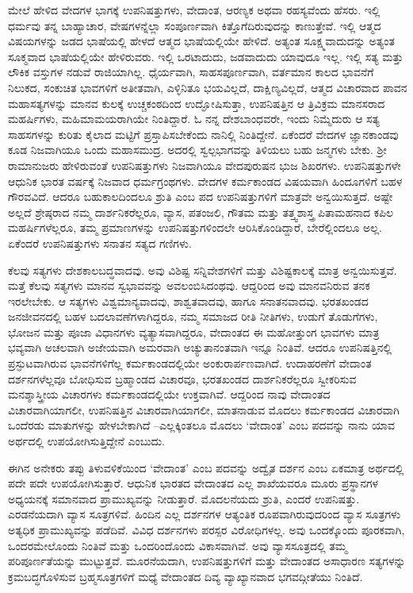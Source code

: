ಮೇಲೆ ಹೇಳಿದ ವೇದಗಳ ಭಾಗಕ್ಕೆ ಉಪನಿಷತ್ತುಗಳು, ವೇದಾಂತ, ಆರಣ್ಯಕ ಅಥವಾ ರಹಸ್ಯವೆಂದು ಹೆಸರು. ಇಲ್ಲಿ ಧರ್ಮವು ತನ್ನ ಬಾಹ್ಯಾಚಾರ, ವೇಷಗಳನ್ನೆಲ್ಲಾ ಸಂಪೂರ್ಣವಾಗಿ ಕಿತ್ತೊಗೆದಿರುವುದನ್ನು ಕಾಣುತ್ತೇವೆ. ಇಲ್ಲಿ ಆತ್ಮದ ವಿಷಯಗಳನ್ನು ಜಡದ ಭಾಷೆಯಲ್ಲಿ ಹೇಳದೆ ಆತ್ಮದ ಭಾಷೆಯಲ್ಲಿಯೇ ಹೇಳಿದೆ. ಅತ್ಯಂತ ಸೂಕ್ಷ್ಮವಾದುದನ್ನು ಅತ್ಯಂತ ಸೂಕ್ಮವಾದ ಭಾಷೆಯಲ್ಲಿಯೇ ಹೇಳಿರುವರು. ಇಲ್ಲಿ ಒರಟಾದುದು, ಜಡವಾದುದು ಯಾವುದೂ ಇಲ್ಲ. ಇಲ್ಲಿ ಸತ್ಯ ಮತ್ತು ಲೌಕಿಕ ವಸ್ತುಗಳ ನಡುವೆ ರಾಜಿಯಾಗಿಲ್ಲ. ಧೈರ್ಯವಾಗಿ, ಸಾಹಸಪೂರ್ಣವಾಗಿ, ವರ್ತಮಾನ ಕಾಲದ ಭಾವನೆಗೆ ನಿಲುಕದ, ಸಂಕುಚಿತ ಭಾವಗಳಿಗೆ ಅತೀತವಾಗಿ, ಎಳ್ಳಿನಿತೂ ಭಯವಿಲ್ಲದೆ, ದಾಕ್ಷಿಣ್ಯವಿಲ್ಲದೆ, ಆತ್ಮದ ವಿಚಾರವಾದ ಪಾವನ ಮಹಾಸತ್ಯಗಳನ್ನು ಮಾನವ ಕುಲಕ್ಕೆ ಉಚ್ಚಕಂಠದಿಂದ ಉದ್ಘೋಷಿಸುತ್ತಾ, ಉಪನಿಷತ್ತಿನ ಆ ತ್ರಿವಿಕ್ರಮ ಮಾನಸರಾದ ಮಹರ್ಷಿಗಳು, ಮಹಿಮಾಮಯರಾಗಿಯೇ ನಿಂತಿದ್ದಾರೆ. ಓ ನನ್ನ ದೇಶಬಾಂಧವರೇ, ಇಂದು ನಿಮ್ಮೆದುರು ಆ ಸತ್ಯ ಸಾಹಸಗಳನ್ನು ಕುರಿತು ಕೈಲಾದ ಮಟ್ಟಿಗೆ ಪ್ರಸ್ತಾಪಿಸಬೇಕೆಂದು ನಾನಿಲ್ಲಿ ನಿಂತಿದ್ದೇನೆ. ಏಕೆಂದರೆ ವೇದಗಳ ಜ್ಞಾನಕಾಂಡವು ಕೂಡ ನಿಜವಾಗಿಯೂ ಒಂದು ಮಹಾಸಮುದ್ರ. ಅದರಲ್ಲಿ ಸ್ವಲ್ಪಭಾಗವನ್ನು ತಿಳಿಯಲು ಬಹು ಜನ್ಮಗಳು ಬೇಕು. ಶ‍್ರೀ ರಾಮಾನುಜರು ಹೇಳಿರುವಂತೆ ಉಪನಿಷತ್ತುಗಳು ನಿಜವಾಗಿಯೂ ವೇದಪುರುಷನ ಭುಜ ಶಿಖರಗಳು. ಉಪನಿಷತ್ತುಗಳೇ ಆಧುನಿಕ ಭಾರತ ವರ್ಷಕ್ಕೆ ನಿಜವಾದ ಧರ್ಮಗ್ರಂಥಗಳು. ವೇದಗಳ ಕರ್ಮಕಾಂಡದ ವಿಷಯವಾಗಿ ಹಿಂದೂಗಳಿಗೆ ಬಹಳ ಗೌರವವಿದೆ. ಆದರೂ ಬಹುಕಾಲದಿಂದಲೂ ಶ್ರುತಿ ಎಂಬ ಪದ ಉಪನಿಷತ್ತುಗಳಿಗೆ ಮಾತ್ರವೇ ಅನ್ವಯಿಸುತ್ತದೆ. ಅಷ್ಟೇ ಅಲ್ಲದೆ ಶ್ರೇಷ್ಠರಾದ ನಮ್ಮ ದಾರ್ಶನಿಕರೆಲ್ಲರೂ, ವ್ಯಾಸ, ಪತಂಜಲಿ, ಗೌತಮ ಮತ್ತು ತತ್ತ್ವಶಾಸ್ತ್ರ ಪಿತಾಮಹನಾದ ಕಪಿಲ ಮಹರ್ಷಿಗಳೆಲ್ಲರೂ, ತಮ್ಮ ಪ್ರಮಾಣಗಳನ್ನು ಉಪನಿಷತ್ತುಗಳಿಂದಲೇ ಆರಿಸಿಕೊಂಡಿದ್ದಾರೆ, ಬೇರೆಲ್ಲಿಂದಲೂ ಅಲ್ಲ. ಏಕೆಂದರೆ ಉಪನಿಷತ್ತುಗಳು ಸನಾತನ ಸತ್ಯದ ಗಣಿಗಳು. 

ಕೆಲವು ಸತ್ಯಗಳು ದೇಶಕಾಲಬದ್ಧವಾದವು. ಅವು ವಿಶಿಷ್ಟ ಸನ್ನಿವೇಶಗಳಿಗೆ ಮತ್ತು ವಿಶಿಷ್ಟಕಾಲಕ್ಕೆ ಮಾತ್ರ ಅನ್ವಯಿಸುತ್ತವೆ. ಮತ್ತೆ ಕೆಲವು ಸತ್ಯಗಳು ಮಾನವ ಸ್ವಭಾವವನ್ನು ಅವಲಂಬಿಸಿದಂಥವು. ಆದ್ದರಿಂದ ಅವು ಮಾನವನಿರುವ ತನಕ ಇರಲೇಬೇಕು. ಆ ಸತ್ಯಗಳು ವಿಶ್ವಮಾನ್ಯವಾದವು, ಶಾಶ್ವತವಾದವು, ಹಾಗೂ ಸನಾತನವಾದವು. ಭರತಖಂಡದ ಜನಜೀವನದಲ್ಲಿ ಬಹಳ ಬದಲಾವಣೆಗಳಾಗಿದ್ದರೂ, ನಮ್ಮ ಸಮಾಜದ ರೀತಿ ನೀತಿಗಳು, ಉಡುಗೆ ತೊಡುಗೆಗಳು, ಭೋಜನ ಮತ್ತು ಪೂಜಾ ವಿಧಾನಗಳು ವ್ಯತ್ಯಾಸವಾಗಿದ್ದರೂ, ವೇದಾಂತದ ಈ ಮಹೋತ್ತುಂಗ ಭಾವಗಳು ಮಾತ್ರ ಭವ್ಯವಾಗಿ ಅಚಲವಾಗಿ ಅಜೇಯವಾಗಿ ಅಮರವಾಗಿ ಅಚ್ಯುತಾನಂತವಾಗಿ ಇನ್ನೂ ನಿಂತಿವೆ. ಆದರೂ ಉಪನಿಷತ್ತಿನಲ್ಲಿ ಪ್ರಸ್ಫುಟವಾಗಿರುವ ಭಾವನೆಗಳಿಗೆಲ್ಲ ಕರ್ಮಕಾಂಡದಲ್ಲಿಯೇ ಅಂಕುರಾರ್ಪಣವಾಗಿದೆ. ಉದಾಹರಣೆಗೆ ವೇದಾಂತ ದರ್ಶನಗಳೆಲ್ಲವೂ ಬೋಧಿಸುವ ಬ್ರಹ್ಮಾಂಡದ ವಿಚಾರವೂ, ಭರತಖಂಡದ ದಾರ್ಶನಿಕರೆಲ್ಲರೂ ಸ್ವೀಕರಿಸುವ ಮನಶ್ಶಾಸ್ತ್ರೀಯ ವಿಚಾರಗಳು ಕರ್ಮಕಾಂಡದಲ್ಲಿಯೇ ಉಕ್ತವಾಗಿವೆ. ಆದ್ದರಿಂದ ನಾವು ವೇದಾಂತದ ವಿಚಾರವಾಗಿಯಾಗಲೀ, ಉಪನಿಷತ್ತಿನ ವಿಚಾರವಾಗಿಯಾಗಲೀ, ಮಾತನಾಡುವ ಮೊದಲು ಕರ್ಮಕಾಂಡದ ವಿಚಾರವಾಗಿ ಒಂದೆರಡು ಮಾತುಗಳನ್ನು ಹೇಳಬೇಕಾಗಿದೆ –\break ಎಲ್ಲಕ್ಕಿಂತಲೂ ಮೊದಲು ‘ವೇದಾಂತ’ ಎಂಬ ಪದವನ್ನು ನಾನು ಯಾವ ಅರ್ಥದಲ್ಲಿ ಉಪಯೋಗಿಸುತ್ತಿದ್ದೇನೆ ಎಂಬುದು. 

ಈಗಿನ ಅನೇಕರು ತಪ್ಪು ತಿಳುವಳಿಕೆಯಿಂದ ‘ವೇದಾಂತ’ ಎಂಬ ಪದವನ್ನು ಅದ್ವೈತ ದರ್ಶನ ಎಂಬ ಏಕಮಾತ್ರ ಅರ್ಥದಲ್ಲಿ ಪದೇ ಪದೇ ಉಪಯೋಗಿಸುತ್ತಾರೆ. ಆಧುನಿಕ ಭಾರತದ ವೇದಾಂತದ ಎಲ್ಲ ಶಾಖೆಯವರೂ ಮೂರು ಪ್ರಸ್ಥಾನಗಳ ಅಧ್ಯಯನಕ್ಕೆ ಸಮಾನವಾದ ಪ್ರಾಮುಖ್ಯವನ್ನು ನೀಡುತ್ತಾರೆ. ಮೊದಲನೆಯದು ಶ್ರುತಿ, ಎಂದರೆ ಉಪನಿಷತ್ತು. ಎರಡನೆಯದಾಗಿ ವ್ಯಾಸ ಸೂತ್ರಗಳಿವೆ. ಹಿಂದಿನ ಎಲ್ಲ ದರ್ಶನಗಳ ಆತ್ಯಂತಿಕ ರೂಪವಾಗಿರುವುದರಿಂದ ವ್ಯಾಸ ಸೂತ್ರಗಳು ಅತ್ಯಧಿಕ ಪ್ರಾಮುಖ್ಯವನ್ನು ಪಡೆದಿವೆ. ವಿವಿಧ ದರ್ಶನಗಳು ಪರಸ್ಪರ ವಿರೋಧಿಗಳಲ್ಲ. ಅವು ಒಂದಕ್ಕೊಂದು ಪೂರಕವಾಗಿ, ಒಂದರಮೇಲೊಂದು ನಿಂತಿವೆ ಮತ್ತು ಒಂದರಿಂದೊಂದು ವಿಕಾಸವಾಗಿವೆ. ಅವು ವ್ಯಾಸಸೂತ್ರದಲ್ಲಿ ತಮ್ಮ ಪರಿಪೂರ್ಣತೆಯನ್ನು ಮುಟ್ಟುತ್ತವೆ. ಮೂರನೆಯದಾಗಿ, ಉಪನಿಷತ್ತುಗಳಿಗೆ ಮತ್ತು ವೇದಾಂತದ ಅಸಾಧಾರಣ ಸತ್ಯಗಳನ್ನು ಕ್ರಮಬದ್ಧಗೊಳಿಸುವ ಬ್ರಹ್ಮಸೂತ್ರಗಳಿಗೆ ಮಧ್ಯೆ ವೇದಾಂತದ ದಿವ್ಯ ವ್ಯಾಖ್ಯಾನವಾದ ಭಗವದ್ಗೀತೆಯು ನಿಂತಿದೆ. 

